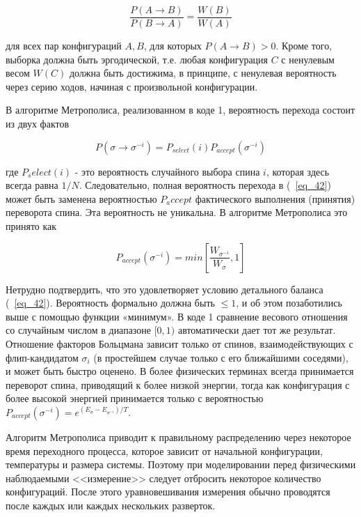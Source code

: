 \documentclass[11pt]{article}
\begin{document}
\begin{equation}
\frac{P(A→B)}{P(B→A)} = \frac{W(B)}{W(A)}
\label{eq_42}
\end{equation}

для всех пар конфигураций $A, B$, для которых $P(A \to B)> 0$. Кроме того, выборка должна быть эргодической, т.е. любая конфигурация $C$ с ненулевым весом $W(C)$ должна быть достижима, в принципе, с ненулевая вероятность через серию ходов, начиная с произвольной конфигурации.

В алгоритме Метрополиса, реализованном в коде {1}, вероятность перехода состоит из двух фактов

\begin{equation}
P(\sigma→\sigma^{-i})=P_{select}(i)P_{accept}(\sigma^{-i})
\label{eq_42}
\end{equation}

где $P_select(i)$ - это вероятность случайного выбора спина $i$, которая здесь всегда равна $1 / N$. Следовательно, полная вероятность перехода в (~\ref{eq_42}) может быть заменена вероятностью $P_accept$ фактического выполнения (принятия) переворота спина. Эта вероятность не уникальна.
В алгоритме Метрополиса это принято как

\begin{equation}
P_{accept}(\sigma^{-i}) = min[\frac{W_{\sigma^{-i}}}{W_\sigma},1]
\label{eq_42}
\end{equation}

Нетрудно подтвердить, что это удовлетворяет условию детального баланса (~\ref{eq_42}). Вероятность формально должна быть $≤ 1$, и об этом позаботились выше с помощью функции «минимум». В коде {1} сравнение весового отношения со случайным числом в диапазоне $[0, 1)$ автоматически дает тот же результат. Отношение факторов Больцмана зависит только от спинов, взаимодействующих с флип-кандидатом $\sigma_i$ (в простейшем случае только с его ближайшими соседями), и может быть быстро оценено. В более физических терминах всегда принимается переворот спина, приводящий к более низкой энергии, тогда как конфигурация с более высокой энергией принимается только с вероятностью $P_{accept}(\sigma^{−i}) = e^{(E_\sigma - E_{\sigma^{−i}}) / T} $.

Алгоритм Метрополиса приводит к правильному распределению через некоторое время переходного процесса, которое зависит от начальной конфигурации, температуры и размера системы. Поэтому при моделировании перед физическими наблюдаемыми <<измерение>> следует отбросить некоторое количество конфигураций. После этого уравновешивания измерения обычно проводятся после каждых или каждых нескольких разверток.
\end{document}
